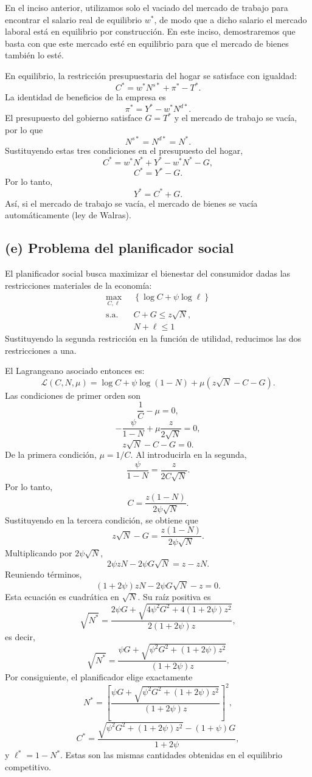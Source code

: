 \documentclass[11pt]{article}
\begin{document}
En el inciso anterior, utilizamos solo el vaciado del mercado de trabajo para encontrar el salario real de equilibrio $w^*$, de modo que a dicho salario el mercado laboral está en equilibrio por construcción. En este inciso, demostraremos que basta con que este mercado esté en equilibrio para que el mercado de bienes también lo esté.


En equilibrio, la restricción presupuestaria del hogar se satisface con igualdad:
\[
  C^*=w^*N^{s*}+\pi^*-T^*.
\]
La identidad de beneficios de la empresa es
\[
  \pi^*=Y^*-w^*N^{d*}.
\]
El presupuesto del gobierno satisface $G = T^*$ y el mercado de trabajo se vacía, por lo que
\[
  N^{s*}=N^{d*}=N^*.
\]
Sustituyendo estas tres condiciones en el presupuesto del hogar,
\[
  C^*
  =w^*N^*+Y^*-w^*N^*-G,
\]
\[
  C^*=Y^*-G.
\]
Por lo tanto,
\[
  \boxed{Y^*=C^*+G}.
\]
Así, si el mercado de trabajo se vacía, el mercado de bienes se vacía automáticamente (ley de Walras).

\subsection*{(e) Problema del planificador social}

El planificador social busca maximizar el bienestar del consumidor dadas las restricciones materiales de la economía:
\begin{align*}
  \max_{C,\ell}
  &\left\{\log C+\psi\log \ell \right\} \\
  \text{s.a.} \quad &C+G\leq z\sqrt N, \\
  &N + \ell \leq 1
\end{align*}
Sustituyendo la segunda restricción en la función de utilidad, reducimos las dos restricciones a una.

El Lagrangeano asociado entonces es:
\[
  \mathcal L(C, N, \mu)
  =\log C+\psi\log(1-N)
  +\mu\left(z\sqrt N-C-G\right).
\]
Las condiciones de primer orden son
\[
  \frac{1}{C}-\mu=0,
\]
\[
  -\frac{\psi}{1-N}+\mu\frac{z}{2\sqrt N}=0,
\]
\[
  z\sqrt N-C-G=0.
\]
De la primera condición, $\mu=1/C$. Al introducirla en la segunda,
\[
  \frac{\psi}{1-N}=\frac{z}{2C\sqrt N}.
\]
Por lo tanto,
\[
  C=\frac{z(1-N)}{2\psi\sqrt N}.
\]
Sustituyendo en la tercera condición, se obtiene que
\[
  z\sqrt N-G=\frac{z(1-N)}{2\psi\sqrt N}.
\]
Multiplicando por $2\psi\sqrt N$,
\[
  2\psi zN-2\psi G\sqrt N=z-zN.
\]
Reuniendo términos,
\[
  (1+2\psi)zN-2\psi G\sqrt N-z=0.
\]
Esta ecuación es cuadrática en $\sqrt N$. Su raíz positiva es
\[
  \sqrt{N^*}
  =\frac{2\psi G+\sqrt{4\psi^2G^2+4(1+2\psi)z^2}}
  {2(1+2\psi)z},
\]
es decir,
\[
  \sqrt{N^*}
  =\frac{\psi G+\sqrt{\psi^2G^2+(1+2\psi)z^2}}
  {(1+2\psi)z}.
\]
Por consiguiente, el planificador elige exactamente
\[
  N^*
  =\left[
  \frac{\psi G+\sqrt{\psi^2G^2+(1+2\psi)z^2}}
  {(1+2\psi)z}
  \right]^2,
\]
\[
  C^*
  =\frac{\sqrt{\psi^2G^2+(1+2\psi)z^2}-(1+\psi)G}
  {1+2\psi},
\]
y $\ell^*=1-N^*$. Estas son las mismas cantidades obtenidas en el equilibrio competitivo.
\end{document}
